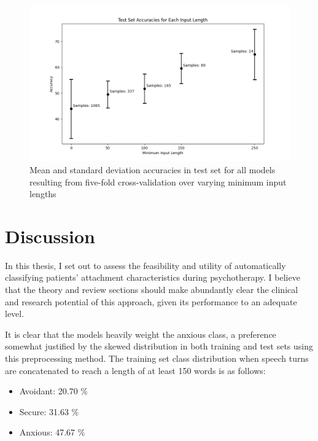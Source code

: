 \documentclass[12pt]{report}
\begin{document}
\begin{figure}
    \includegraphics[width=\textwidth]{figures/roberta-large_acc_for_min_len.png}
    \caption{Mean and standard deviation accuracies in test set for all models resulting from five-fold cross-validation over varying minimum input lengths}
    \label{fig: roberta-large results}
\end{figure}

\section{Discussion}
In this thesis, I set out to assess the feasibility and utility of automatically classifying patients' attachment characteristics during psychotherapy.
I believe that the theory and review sections should make abundantly clear the clinical and research potential of this approach, given its performance to an adequate level.


It is clear that the models heavily weight the anxious class, a preference somewhat justified by the skewed distribution in both training and test sets using this preprocessing method.
The training set class distribution when speech turns are concatenated to reach a length of at least 150 words is as follows:
\begin{itemize}
    \item Avoidant: 20.70 \%
    \item Secure: 31.63 \%
    \item Anxious: 47.67 \%
\end{itemize}
\end{document}
